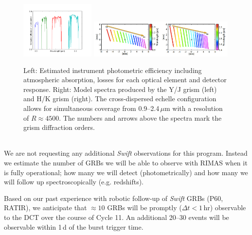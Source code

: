 \documentclass[letterpaper,11pt]{article}
\begin{document}
\begin{figure}[tp!]
\begin{center}
\includegraphics[width=0.33\textwidth]{figures/slide5.pdf}
\includegraphics[width=0.65\textwidth]{figures/xdisperse.pdf}
\vspace{-0.9cm}
\end{center}
\caption{\footnotesize
{ Left: Estimated instrument photometric efficiency including atmospheric absorption, 
losses for each optical element and detector response.  Right: Model spectra produced 
by the Y/J grism (left) and H/K grism (right).  The cross-dispersed echelle 
configuration allows for simultaneous coverage from 0.9--2.4\,$\mu$m with a 
resolution of $R \approx 4500$.  The numbers and arrows above the spectra mark the 
grism diffraction orders. }}
\vspace{-0.4cm}
\end{figure}




\smallskip\\
We are not requesting any additional \textit{Swift} observations for this program.
Instead we estimate the number of GRBs we will be able to observe
with RIMAS when it is fully operational; how many we will detect (photometrically) and 
how many we will follow up spectroscopically (e.g. redshifts). 

Based on our past experience with robotic follow-up of \textit{Swift} GRBs (P60,
RATIR), we anticipate that $\approx 10$ GRBs will be promptly ($\Delta t < 1$\,hr) 
observable to the DCT over the course of Cycle 11.  An additional 20--30 events will 
be observable within 1\,d of the burst trigger time.
\end{document}
